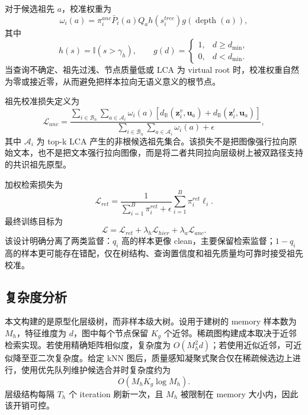 对于候选祖先 $a$，校准权重为
\begin{equation}
    \omega_i(a)
    =
    \pi_i^{anc}
    \bar{P}_i(a)
    Q_a
    h(s_i^{tree})
    g(\operatorname{depth}(a)),
\end{equation}
其中
\begin{equation}
    h(s)=\mathbb{I}(s>\gamma_h),
    \qquad
    g(d)=
    \begin{cases}
    1, & d\geq d_{\min},\\
    0, & d<d_{\min}.
    \end{cases}
\end{equation}
当查询不确定、祖先过浅、节点质量低或 LCA 为 virtual root 时，校准权重自然为零或接近零，从而避免把样本拉向无语义意义的根节点。

祖先校准损失定义为
\begin{equation}
    \mathcal{L}_{anc}
    =
    \frac{
    \sum_{i\in\mathcal{B}_n}
    \sum_{a\in\mathcal{A}_i}
    \omega_i(a)
    \left[
    d_{\mathbb{B}}(\boldsymbol{z}_i^v,\boldsymbol{u}_a)
    +
    d_{\mathbb{B}}(\boldsymbol{z}_i^t,\boldsymbol{u}_a)
    \right]
    }
    {
    \sum_{i\in\mathcal{B}_n}
    \sum_{a\in\mathcal{A}_i}
    \omega_i(a)+\epsilon
    },
\end{equation}
其中 $\mathcal{A}_i$ 为 top-k LCA 产生的非根候选祖先集合。该损失不是把图像强行拉向原始文本，也不是把文本强行拉向图像，而是将二者共同拉向层级树上被双路径支持的共识祖先原型。

加权检索损失为
\begin{equation}
    \mathcal{L}_{ret}
    =
    \frac{1}{\sum_{i=1}^{B}\pi_i^{ret}+\epsilon}
    \sum_{i=1}^{B}\pi_i^{ret}\ell_i.
\end{equation}
最终训练目标为
\begin{equation}
    \mathcal{L}
    =
    \mathcal{L}_{ret}
    +
    \lambda_h\mathcal{L}_{hier}
    +
    \lambda_a\mathcal{L}_{anc}.
\end{equation}
该设计明确分离了两类监督：$q_i$ 高的样本更像 clean，主要保留检索监督；$1-q_i$ 高的样本更可能存在错配，仅在树结构、查询置信度和祖先质量均可靠时接受祖先校准。

\subsection{复杂度分析}

本文构建的是原型化层级树，而非样本级大树。设用于建树的 memory 样本数为 $M_h$，特征维度为 $d$，图中每个节点保留 $K_g$ 个近邻。稀疏图构建成本取决于近邻检索实现。若使用精确矩阵相似度，复杂度为 $O(M_h^2d)$；若使用近似近邻，可近似降至亚二次复杂度。给定 kNN 图后，质量感知凝聚式聚合仅在稀疏候选边上进行，使用优先队列维护候选合并时复杂度约为
\begin{equation}
    O(M_hK_g\log M_h).
\end{equation}
层级结构每隔 $T_h$ 个 iteration 刷新一次，且 $M_h$ 被限制在 memory 大小内，因此该开销可控。

